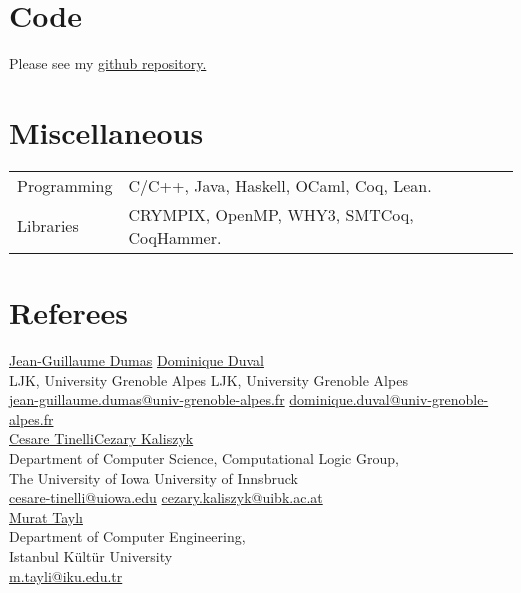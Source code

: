 \documentclass[a4paper,9pt]{article} %
\begin{document}
\section*{Code}

Please see my \href{https://github.com/ekiciburak}{github repository.}

\section*{Miscellaneous}

\begin{tabular}{ll}	
Programming & C/C++, Java, Haskell, OCaml, Coq, Lean. \\
Libraries & CRYMPIX, OpenMP, WHY3, SMTCoq, CoqHammer.
\end{tabular}

\section*{Referees}

\href{http://ljk.imag.fr/membres/Jean-Guillaume.Dumas/}{Jean-Guillaume Dumas} \hfill \href{http://ljk.imag.fr/membres/Dominique.Duval/}{Dominique Duval}\\
LJK, University Grenoble Alpes \hfill LJK, University Grenoble Alpes\\
\href{mailto:jean-guillaume.dumas@univ-grenoble-alpes.fr}{jean-guillaume.dumas@univ-grenoble-alpes.fr} \hfill \href{mailto:dominique.duval@univ-grenoble-alpes.fr}{dominique.duval@univ-grenoble-alpes.fr}\\

\href{http://homepage.cs.uiowa.edu/~tinelli/index.html}{Cesare Tinelli}\hfill \href{http://cl-informatik.uibk.ac.at/users/cek/}{Cezary Kaliszyk}\\
Department of Computer Science, \hfill Computational Logic Group,\\
The University of Iowa \hfill University of Innsbruck\\
\href{mailto:cesare-tinelli@uiowa.edu}{cesare-tinelli@uiowa.edu} \hfill \href{mailto:cezary.kaliszyk@uibk.ac.at}{cezary.kaliszyk@uibk.ac.at}\\


\href{https://bm.iku.edu.tr/tr/bilgisayar-muhendisligi-bolumu-akademik-kadro}{Murat Taylı}\hfill\\
Department of Computer Engineering, \hfill \\
Istanbul Kültür University \hfill \\
\href{mailto: m.tayli@iku.edu.tr}{m.tayli@iku.edu.tr} \hfill 
\end{document}
